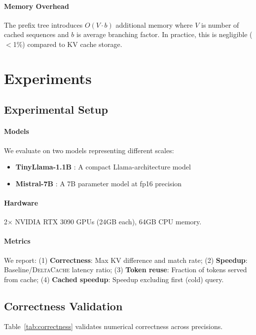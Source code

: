 \documentclass{article}
\newcommand{\deltacache}{\textsc{DeltaCache}}
\begin{document}
\paragraph{Memory Overhead}
The prefix tree introduces $O(V \cdot b)$ additional memory where $V$ is number of cached sequences and $b$ is average branching factor. In practice, this is negligible ($<$1\%) compared to KV cache storage.

\section{Experiments}
\label{sec:experiments}

\subsection{Experimental Setup}

\paragraph{Models}
We evaluate on two models representing different scales:
\begin{itemize}
    \item \textbf{TinyLlama-1.1B} \citep{tinyllama}: A compact Llama-architecture model
    \item \textbf{Mistral-7B} \citep{jiang2023mistral}: A 7B parameter model at fp16 precision
\end{itemize}

\paragraph{Hardware}
2$\times$ NVIDIA RTX 3090 GPUs (24GB each), 64GB CPU memory.

\paragraph{Metrics}
We report: (1) \textbf{Correctness}: Max KV difference and match rate; (2) \textbf{Speedup}: Baseline/\deltacache{} latency ratio; (3) \textbf{Token reuse}: Fraction of tokens served from cache; (4) \textbf{Cached speedup}: Speedup excluding first (cold) query.

\subsection{Correctness Validation}

Table~\ref{tab:correctness} validates numerical correctness across precisions.
\end{document}
